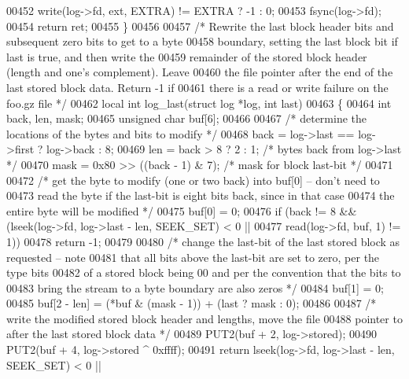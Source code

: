 \begin{DoxyCode}
00452           write(log->fd, ext, EXTRA) != EXTRA ? -1 : 0;
00453     fsync(log->fd);
00454     \textcolor{keywordflow}{return} ret;
00455 \}
00456 
00457 \textcolor{comment}{/* Rewrite the last block header bits and subsequent zero bits to get to a byte}
00458 \textcolor{comment}{   boundary, setting the last block bit if last is true, and then write the}
00459 \textcolor{comment}{   remainder of the stored block header (length and one's complement).  Leave}
00460 \textcolor{comment}{   the file pointer after the end of the last stored block data.  Return -1 if}
00461 \textcolor{comment}{   there is a read or write failure on the foo.gz file */}
00462 local \textcolor{keywordtype}{int} log\_last(\textcolor{keyword}{struct} log *log, \textcolor{keywordtype}{int} last)
00463 \{
00464     \textcolor{keywordtype}{int} back, len, mask;
00465     \textcolor{keywordtype}{unsigned} \textcolor{keywordtype}{char} buf[6];
00466 
00467     \textcolor{comment}{/* determine the locations of the bytes and bits to modify */}
00468     back = log->last == log->first ? log->back : 8;
00469     len = back > 8 ? 2 : 1;                 \textcolor{comment}{/* bytes back from log->last */}
00470     mask = 0x80 >> ((back - 1) & 7);        \textcolor{comment}{/* mask for block last-bit */}
00471 
00472     \textcolor{comment}{/* get the byte to modify (one or two back) into buf[0] -- don't need to}
00473 \textcolor{comment}{       read the byte if the last-bit is eight bits back, since in that case}
00474 \textcolor{comment}{       the entire byte will be modified */}
00475     buf[0] = 0;
00476     \textcolor{keywordflow}{if} (back != 8 && (lseek(log->fd, log->last - len, SEEK\_SET) < 0 ||
00477                       read(log->fd, buf, 1) != 1))
00478         \textcolor{keywordflow}{return} -1;
00479 
00480     \textcolor{comment}{/* change the last-bit of the last stored block as requested -- note}
00481 \textcolor{comment}{       that all bits above the last-bit are set to zero, per the type bits}
00482 \textcolor{comment}{       of a stored block being 00 and per the convention that the bits to}
00483 \textcolor{comment}{       bring the stream to a byte boundary are also zeros */}
00484     buf[1] = 0;
00485     buf[2 - len] = (*buf & (mask - 1)) + (last ? mask : 0);
00486 
00487     \textcolor{comment}{/* write the modified stored block header and lengths, move the file}
00488 \textcolor{comment}{       pointer to after the last stored block data */}
00489     PUT2(buf + 2, log->stored);
00490     PUT2(buf + 4, log->stored ^ 0xffff);
00491     \textcolor{keywordflow}{return} lseek(log->fd, log->last - len, SEEK\_SET) < 0 ||

\end{DoxyCode}
